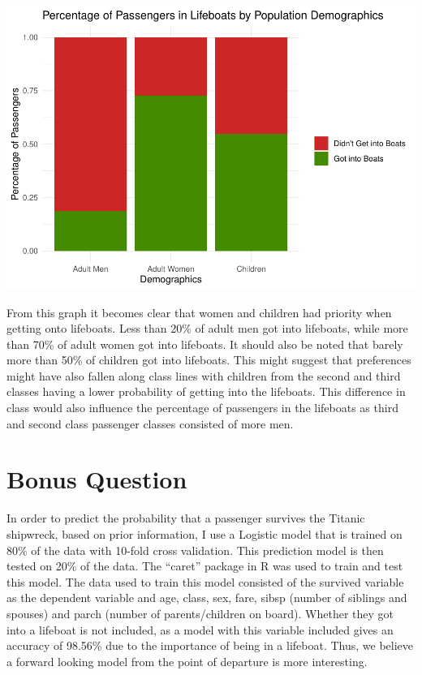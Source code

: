 \documentclass[
  11pt,
]{article}
\begin{document}
\includegraphics{README_files/figure-latex/unnamed-chunk-7-1.pdf}

From this graph it becomes clear that women and children had priority
when getting onto lifeboats. Less than 20\% of adult men got into
lifeboats, while more than 70\% of adult women got into lifeboats. It
should also be noted that barely more than 50\% of children got into
lifeboats. This might suggest that preferences might have also fallen
along class lines with children from the second and third classes having
a lower probability of getting into the lifeboats. This difference in
class would also influence the percentage of passengers in the lifeboats
as third and second class passenger classes consisted of more men.

\hypertarget{bonus-question}{%
\section{Bonus Question}\label{bonus-question}}

In order to predict the probability that a passenger survives the
Titanic shipwreck, based on prior information, I use a Logistic model
that is trained on 80\% of the data with 10-fold cross validation. This
prediction model is then tested on 20\% of the data. The ``caret''
package in R was used to train and test this model. The data used to
train this model consisted of the survived variable as the dependent
variable and age, class, sex, fare, sibsp (number of siblings and
spouses) and parch (number of parents/children on board). Whether they
got into a lifeboat is not included, as a model with this variable
included gives an accuracy of 98.56\% due to the importance of being in
a lifeboat. Thus, we believe a forward looking model from the point of
departure is more interesting.
\end{document}
